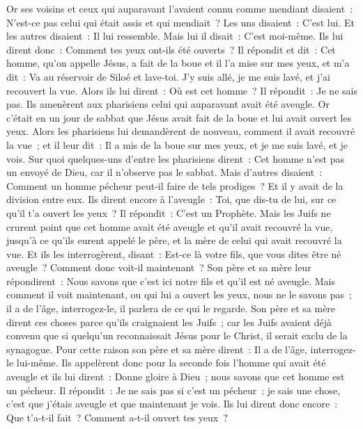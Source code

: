 \begin{multicols}{2}
Or ses voisins et ceux qui auparavant l'avaient connu comme mendiant disaient~: N'est-ce pas celui qui était assis et qui mendiait~?
Les uns disaient~: C'est lui. Et les autres disaient~: Il lui ressemble. Mais lui il disait~: C'est moi-même.
Ils lui dirent donc~: Comment tes yeux ont-ils été ouverts~?
Il répondit et dit~: Cet homme, qu'on appelle Jésus, a fait de la boue et il l'a mise sur mes yeux, et m'a dit~: Va au réservoir de Siloé et lave-toi. J'y suis allé, je me suis lavé, et j'ai recouvert la vue.
Alors ils lui dirent~: Où est cet homme~? Il répondit~: Je ne sais pas.
Ils amenèrent aux pharisiens celui qui auparavant avait été aveugle.
Or c'était en un jour de sabbat que Jésus avait fait de la boue et lui avait ouvert les yeux.
Alors les pharisiens lui demandèrent de nouveau, comment il avait recouvré la vue~; et il leur dit~: Il a mis de la boue sur mes yeux, et je me suis lavé, et je vois.
Sur quoi quelques-uns d'entre les pharisiens dirent~: Cet homme n'est pas un envoyé de Dieu, car il n'observe pas le sabbat. Mais d'autres disaient~: Comment un homme pécheur peut-il faire de tels prodiges~? Et il y avait de la division entre eux.
Ils dirent encore à l'aveugle~: Toi, que dis-tu de lui, sur ce qu'il t'a ouvert les yeux~? Il répondit~: C'est un Prophète.
Mais les Juifs ne crurent point que cet homme avait été aveugle et qu'il avait recouvré la vue, jusqu'à ce qu'ils eurent appelé le père, et la mère de celui qui avait recouvré la vue.
Et ils les interrogèrent, disant~: Est-ce là votre fils, que vous dites être né aveugle~? Comment donc voit-il maintenant~?
Son père et sa mère leur répondirent~: Nous savons que c'est ici notre fils et qu'il est né aveugle.
Mais comment il voit maintenant, ou qui lui a ouvert les yeux, nous ne le savons pas~; il a de l'âge, interrogez-le, il parlera de ce qui le regarde.
Son père et sa mère dirent ces choses parce qu'ils craignaient les Juifs~; car les Juifs avaient déjà convenu que si quelqu'un reconnaissait Jésus pour le Christ, il serait exclu de la synagogue.
Pour cette raison son père et sa mère dirent~: Il a de l'âge, interrogez-le lui-même.
Ils appelèrent donc pour la seconde fois l'homme qui avait été aveugle et ils lui dirent~: Donne gloire à Dieu~; nous savons que cet homme est un pécheur.
Il répondit~: Je ne sais pas si c'est un pécheur~; je sais une chose, c'est que j'étais aveugle et que maintenant je vois.
Ils lui dirent donc encore~: Que t'a-t-il fait~? Comment a-t-il ouvert tes yeux~?

\end{multicols}

